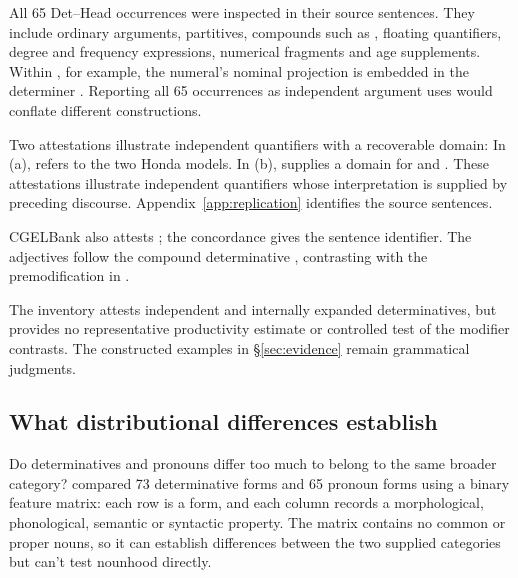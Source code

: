 \documentclass[12pt]{article}
\begin{document}
All 65 Det--Head occurrences were inspected in their source sentences. They include ordinary arguments, partitives, compounds such as , floating quantifiers, degree and frequency expressions, numerical fragments and age supplements. Within , for example, the numeral's nominal projection is embedded in the determiner . Reporting all 65 occurrences as independent argument uses would conflate different constructions.

Two attestations illustrate independent quantifiers with a recoverable domain:
\ea\label{ex:attested-quantifiers}
\ea {}
\ex {}
\z\z
In (a),  refers to the two Honda models. In (b),  supplies a domain for  and . These attestations illustrate independent quantifiers whose interpretation is supplied by preceding discourse. Appendix~\ref{app:replication} identifies the source sentences.

CGELBank also attests ; the concordance gives the sentence identifier. The adjectives follow the compound determinative , contrasting with the premodification in .

The inventory attests independent and internally expanded determinatives, but provides no representative productivity estimate or controlled test of the modifier contrasts. The constructed examples in §\ref{sec:evidence} remain grammatical judgments.

\subsection{What distributional differences establish}

Do determinatives and pronouns differ too much to belong to the same broader category? \textcite{reynolds2021} compared 73 determinative forms and 65 pronoun forms using a binary feature matrix: each row is a form, and each column records a morphological, phonological, semantic or syntactic property. The matrix contains no common or proper nouns, so it can establish differences between the two supplied categories but can't test nounhood directly.
\end{document}
